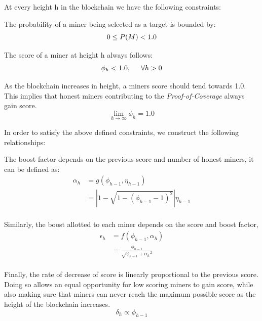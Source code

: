 \documentclass[letterpaper,11pt]{article}
\begin{document}
At every height h in the blockchain we have the following constraints:

The probability of a miner being selected as a target is bounded by:
\begin{equation*} \label{constraint1}
0 \leq P(M) < 1.0 \\
\end{equation*}

The score of a miner at height h always follows:
\begin{equation*} \label{constraint2}
\phi_h < 1.0, \hspace{0.5cm} \forall h > 0
\end{equation*}

As the blockchain increases in height, a miners score should tend towards 1.0. This implies that honest miners contributing to the \emph{Proof-of-Coverage} always gain score.
\begin{equation*} \label{goal}
\lim_{h \to \infty} \phi_h = 1.0
\end{equation*}

In order to satisfy the above defined constraints, we construct the following relationships:

The boost factor depends on the previous score and number of honest miners, it can be defined as:
\begin{equation*} \label{alpha}
\begin{split}
    \alpha_h & = g(\phi_{h-1}, \eta_{h-1}) \\
    & = \left\lvert 1 - \sqrt{1 - {(\phi_{h-1} - 1)}^2} \right\rvert \eta_{h-1} \\
\end{split}
\end{equation*}

Similarly, the boost allotted to each miner depends on the score and boost factor,
\begin{equation*} \label{epsilon}
\begin{split}
    \epsilon_h & = f(\phi_{h-1}, \alpha_h) \\
    & = \frac{\phi_{h-1}}{\sqrt{\phi_{h-1}} + \alpha_h^{-2}}\\
\end{split}
\end{equation*}

Finally, the rate of decrease of score is linearly proportional to the previous score. Doing so allows an equal opportunity for low scoring miners to gain score, while also making sure that miners can never reach the maximum possible score as the height of the blockchain increases.
\begin{equation*} \label{delta}
\delta_h \propto \phi_{h-1}
\end{equation*}
\end{document}

